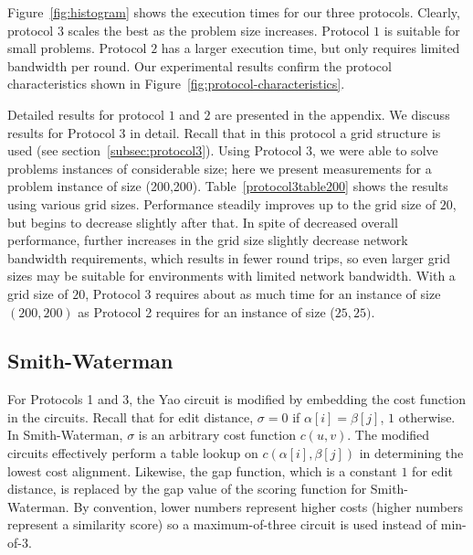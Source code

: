 Figure~\ref{fig:histogram} shows the execution times for our three
protocols. Clearly, protocol $3$ scales the best as the problem size
increases. Protocol $1$ is suitable for small problems. Protocol $2$
has a larger execution time, but only requires limited bandwidth per
round. Our experimental results confirm the protocol characteristics
shown in Figure~\ref{fig:protocol-characteristics}.

\begin{figure*}
\caption{Timing measurements (in minutes and seconds) comparing protocols
1, 2, and 3. The Atallah~\cite{atallah} protocol could not complete problems of
sizes $(25,25)$ and $(25,25)$.}
\label{fig:histogram} 
\end{figure*}

Detailed results for protocol $1$ and $2$ are presented in the
appendix.  We discuss results for Protocol $3$ in detail. Recall that
in this protocol a grid structure is used (see
section~\ref{subsec:protocol3}).  Using Protocol $3$, we were able to
solve problems instances of considerable size; here we present
measurements for a problem instance of size
(200,200). Table~\ref{protocol3table200} shows the results using
various grid sizes. Performance steadily improves up to the grid size
of $20$, but begins to decrease slightly after that.  In spite of
decreased overall performance, further increases in the grid size
slightly decrease network bandwidth requirements, which results in
fewer round trips, so even larger grid sizes may be suitable for
environments with limited network bandwidth.  With a grid size of
$20$, Protocol 3 requires about as much time for an instance of size
$(200,200)$ as Protocol 2 requires for an instance of size ($25,25)$.


\subsection{Smith-Waterman}
\label{sec:sw-experimental}

For Protocols 1 and 3, the Yao circuit is modified by embedding the
cost function in the circuits. Recall that for edit distance, $\sigma=0$
if $\alpha[i]=\beta[j]$, $1$ otherwise. In Smith-Waterman, $\sigma$ is
an arbitrary cost function $c(u,v)$. The modified circuits effectively
perform a table lookup on $c(\alpha[i],\beta[j])$ in determining the
lowest cost alignment. Likewise, the gap function, which is a constant $1$
for edit distance, is replaced by the gap value of the scoring function
for Smith-Waterman. By convention, lower numbers represent higher costs
(higher numbers represent a similarity score) so a maximum-of-three circuit is
used instead of min-of-3.

